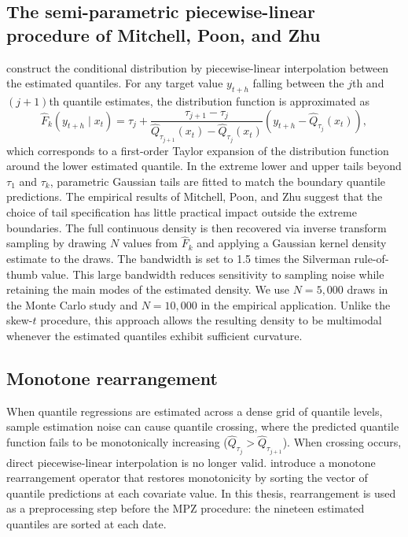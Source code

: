 \documentclass[12pt]{report} %
\begin{document}
\subsection{The semi-parametric piecewise-linear procedure of Mitchell, Poon, and Zhu}
\label{subsec:mpz}

\textcite{mitchell2024constructing} construct the conditional distribution by piecewise-linear interpolation between the estimated quantiles. For any target value $y_{t+h}$ falling between the $j$th and $(j+1)$th quantile estimates, the distribution function is approximated as
\[
\hat{F}_k(y_{t+h} \mid x_t) = \tau_j + \frac{\tau_{j+1} - \tau_j}{\hat{Q}_{\tau_{j+1}}(x_t) - \hat{Q}_{\tau_j}(x_t)} \left(y_{t+h} - \hat{Q}_{\tau_j}(x_t)\right),
\]
which corresponds to a first-order Taylor expansion of the distribution function around the lower estimated quantile. In the extreme lower and upper tails beyond $\tau_1$ and $\tau_k$, parametric Gaussian tails are fitted to match the boundary quantile predictions. The empirical results of Mitchell, Poon, and Zhu suggest that the choice of tail specification has little practical impact outside the extreme boundaries. The full continuous density is then recovered via inverse transform sampling by drawing $N$ values from $\hat{F}_k$ and applying a Gaussian kernel density estimate to the draws. The bandwidth is set to 1.5 times the Silverman rule-of-thumb value. This large bandwidth reduces sensitivity to sampling noise while retaining the main modes of the estimated density. We use $N = 5{,}000$ draws in the Monte Carlo study and $N = 10{,}000$ in the empirical application. Unlike the skew-$t$ procedure, this approach allows the resulting density to be multimodal whenever the estimated quantiles exhibit sufficient curvature.

\subsection{Monotone rearrangement}
\label{subsec:rearrangement}

When quantile regressions are estimated across a dense grid of quantile levels, sample estimation noise can cause quantile crossing, where the predicted quantile function fails to be monotonically increasing ($\hat{Q}_{\tau_j} > \hat{Q}_{\tau_{j+1}}$). When crossing occurs, direct piecewise-linear interpolation is no longer valid. \textcite{chernozhukov2010quantile} introduce a monotone rearrangement operator that restores monotonicity by sorting the vector of quantile predictions at each covariate value. In this thesis, rearrangement is used as a preprocessing step before the MPZ procedure: the nineteen estimated quantiles are sorted at each date.
\end{document}
